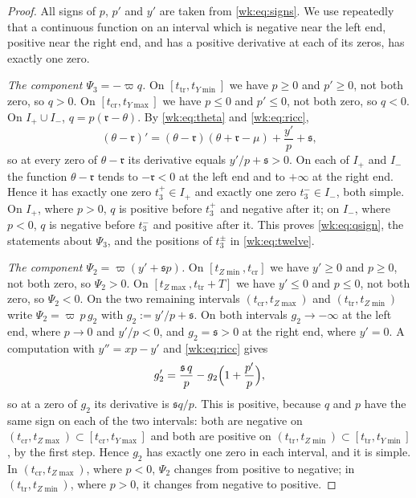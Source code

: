 \begin{proof}
All signs of $p$, $p'$ and $y'$ are taken from \eqref{wk:eq:signs}. We use repeatedly that a continuous function on an interval which is negative near the left end, positive near the right end, and has a positive derivative at each of its zeros, has exactly one zero.

\emph{The component $\Psi_3=-\varpi q$.} On $[t_{\mathrm{tr}},t_{Y\min}]$ we have $p\ge0$ and $p'\ge0$, not both zero, so $q>0$. On $[t_{\mathrm{cr}},t_{Y\max}]$ we have $p\le0$ and $p'\le0$, not both zero, so $q<0$. On $I_+\cup I_-$, $q=p(\mathfrak r-\theta)$. By \eqref{wk:eq:theta} and \eqref{wk:eq:ricc},
\[
(\theta-\mathfrak r)'=(\theta-\mathfrak r)(\theta+\mathfrak r-\mu)+\frac{y'}{p}+\mathfrak s ,
\]
so at every zero of $\theta-\mathfrak r$ its derivative equals $y'/p+\mathfrak s>0$. On each of $I_+$ and $I_-$ the function $\theta-\mathfrak r$ tends to $-\mathfrak r<0$ at the left end and to $+\infty$ at the right end. Hence it has exactly one zero $t_3^+\in I_+$ and exactly one zero $t_3^-\in I_-$, both simple. On $I_+$, where $p>0$, $q$ is positive before $t_3^+$ and negative after it; on $I_-$, where $p<0$, $q$ is negative before $t_3^-$ and positive after it. This proves \eqref{wk:eq:qsign}, the statements about $\Psi_3$, and the positions of $t_3^\pm$ in \eqref{wk:eq:twelve}.

\emph{The component $\Psi_2=\varpi(y'+\mathfrak sp)$.} On $[t_{Z\min},t_{\mathrm{cr}}]$ we have $y'\ge0$ and $p\ge0$, not both zero, so $\Psi_2>0$. On $[t_{Z\max},t_{\mathrm{tr}}+T]$ we have $y'\le0$ and $p\le0$, not both zero, so $\Psi_2<0$. On the two remaining intervals $(t_{\mathrm{cr}},t_{Z\max})$ and $(t_{\mathrm{tr}},t_{Z\min})$ write $\Psi_2=\varpi\,p\,g_2$ with $g_2:=y'/p+\mathfrak s$. On both intervals $g_2\to-\infty$ at the left end, where $p\to0$ and $y'/p<0$, and $g_2=\mathfrak s>0$ at the right end, where $y'=0$. A computation with $y''=xp-y'$ and \eqref{wk:eq:ricc} gives
\[
g_2'=\frac{\mathfrak s\,q}{p}-g_2\Bigl(1+\frac{p'}{p}\Bigr),
\]
so at a zero of $g_2$ its derivative is $\mathfrak sq/p$. This is positive, because $q$ and $p$ have the same sign on each of the two intervals: both are negative on $(t_{\mathrm{cr}},t_{Z\max})\subset[t_{\mathrm{cr}},t_{Y\max}]$ and both are positive on $(t_{\mathrm{tr}},t_{Z\min})\subset[t_{\mathrm{tr}},t_{Y\min}]$, by the first step. Hence $g_2$ has exactly one zero in each interval, and it is simple. In $(t_{\mathrm{cr}},t_{Z\max})$, where $p<0$, $\Psi_2$ changes from positive to negative; in $(t_{\mathrm{tr}},t_{Z\min})$, where $p>0$, it changes from negative to positive.


\end{proof}
